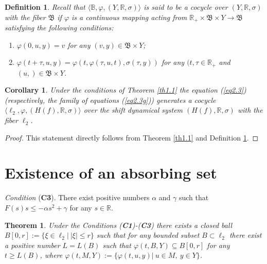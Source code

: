 \documentclass{amsart}%
\newtheorem{theorem}[lemma]{Theorem}
\newtheorem{coro}[lemma]{Corollary}
\newtheorem{definition}[lemma]{Definition}
\begin{document}
\begin{definition}\label{defC1} Recall \cite[Ch.I]{Che_2015} that
$\langle \mathbb B,\varphi, (Y,\mathbb R,\sigma)\rangle$ is said
to be a cocycle over $(Y,\mathbb R,\sigma)$ with the fiber
$\mathfrak B$ if $\varphi$ is a continuous mapping acting from
$\mathbb R_{+}\times \mathfrak B\times Y\to \mathfrak B$
satisfying the following conditions:
\begin{enumerate}
\item $\varphi(0,u,y)=v$ for any $(v,y)\in \mathfrak B\times Y$;
\item
$\varphi(t+\tau,u,y)=\varphi(t,\varphi(\tau,u,t),\sigma(\tau,y))$
for any $(t,\tau \in \mathbb R_{+}$ and $(u,)\in \mathfrak B\times
Y$.
\end{enumerate}
\end{definition}

\begin{coro}\label{corH1}
Under the conditions of Theorem \ref{th1.1} the equation
(\ref{eq2.3}) (respectively, the family of equations
(\ref{eq2.3g})) generates a cocycle $\langle
\ell_{2},\varphi,(H(f),\mathbb R,\sigma)\rangle$ over the shift
dynamical system $(H(f),\mathbb R,\sigma)$ with the fiber
$\ell_{2}$.
\end{coro}
\begin{proof} This statement directly follows from Theorem
\ref{th1.1} and Definition \ref{defC1}.
\end{proof}


\section{Existence of an absorbing set}\label{Sec3}

\emph{Condition} (\textbf{C3}). There exist positive numbers
$\alpha$ and $\gamma$ such that $F(s)s\le -\alpha s^{2}+\gamma$
for any $s\in \mathbb R$.

\begin{theorem}\label{th2.1} Under the Conditions (\textbf{C1})-(\textbf{C3})
there exists a closed ball $B[0,r]:=\{\xi \in \ell_{2}|\ |\xi|\le
r\}$ such that for any bounded subset $B\subset \ell_{2}$ there
exist a positive number $L=L(B)$ such that
$\varphi(t,B,Y)\subseteq B[0,r]$ for any $t\ge L(B)$, where
$\varphi(t,M,Y):=\{\varphi(t,u,y)|\ u\in M,\ y\in Y\}$.
\end{theorem}
\end{document}
